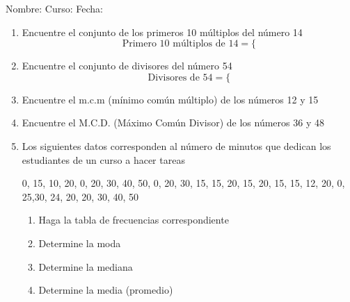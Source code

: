 \documentclass[fleqn]{article}
\newcommand{\LineaNombre}{%
\par
\vspace{\baselineskip}
Nombre:\hrulefill \; Curso: \underline{\hspace*{48pt}} \; Fecha: \underline{\hspace*{2.5cm}} \relax
\par}
\begin{document}
\LineaNombre
\begin{enumerate}
 \item Encuentre el conjunto de los primeros 10 múltiplos del número 14
 \noanswer
 \[\text{Primero 10 múltiplos de }14=\{\]
 \item Encuentre el conjunto de divisores del número 54
 \noanswer
 \[\text{Divisores de }54=\{\]
 \item Encuentre el m.c.m (mínimo común múltiplo) de los números 12 y 15
 \noanswer
 \item Encuentre el M.C.D. (Máximo Común Divisor) de los números 36 y 48
 \noanswer
 \item Los siguientes datos corresponden al número de minutos que dedican los estudiantes de un curso a hacer tareas
 
 0, 15, 10, 20, 0, 20, 30, 40, 50, 0, 20, 30, 15, 15, 20, 15, 20, 15, 15, 12, 20, 0, 25,30, 24, 20, 20, 30, 40, 50
 \begin{enumerate}
  \item Haga la tabla de frecuencias correspondiente \noanswer
  \item Determine la moda\noanswer
  \item Determine la mediana \noanswer
  \item Determine la media (promedio) \noanswer
 \end{enumerate}

 
 \end{enumerate}
\end{document}
